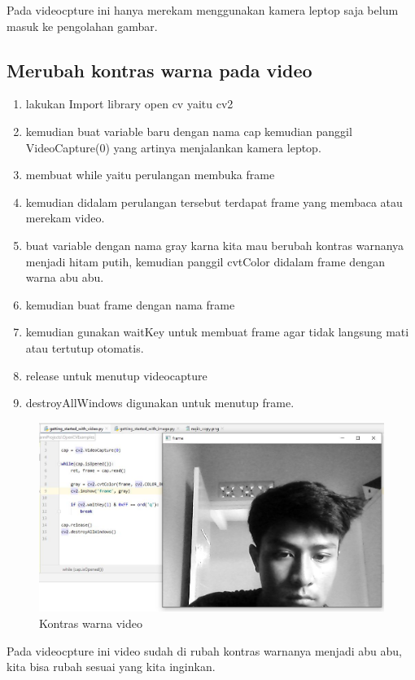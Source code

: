 Pada videocpture ini hanya merekam menggunakan kamera leptop saja belum masuk ke pengolahan gambar.

\newpage
\subsection{Merubah kontras warna pada video}

\begin{enumerate}
	\item lakukan Import library open cv yaitu cv2
	\item kemudian buat variable baru dengan nama cap kemudian panggil VideoCapture(0) yang artinya menjalankan kamera leptop.
	\item membuat while yaitu perulangan membuka frame
	\item kemudian didalam perulangan tersebut terdapat frame yang membaca atau merekam video.
	\item buat variable dengan nama gray karna kita mau berubah kontras warnanya menjadi hitam putih, kemudian panggil cvtColor didalam frame dengan warna abu abu.
	\item kemudian buat frame dengan nama frame
	\item kemudian gunakan waitKey untuk membuat frame agar tidak langsung mati atau tertutup otomatis.
	\item release untuk menutup videocapture
	\item destroyAllWindows digunakan untuk menutup frame.
\end{enumerate}

\newpage
\begin{figure}[ht]
\centering
\includegraphics[scale=0.45]{figures/2,5.jpg}
\caption{Kontras warna video}
\label{contoh}
\end{figure}

Pada videocpture ini video sudah di rubah kontras warnanya menjadi abu abu, kita bisa rubah sesuai yang kita inginkan.

